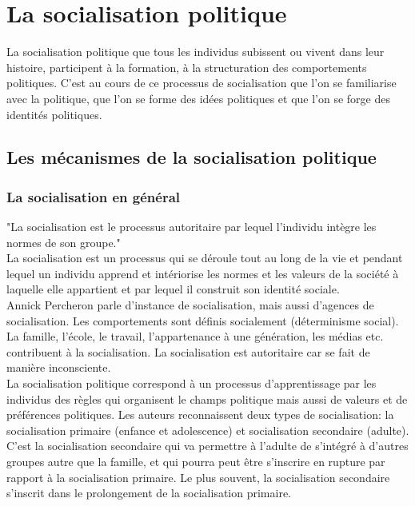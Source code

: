 \documentclass[12pt, a4paper, openany]{book}
\begin{document}
\section{La socialisation politique}

La socialisation politique que tous les individus subissent ou vivent dans leur histoire, participent à la formation, à la structuration des comportements politiques. C'est au cours de ce processus de socialisation que l'on se familiarise avec la politique, que l'on se forme des idées politiques et que l'on se forge des identités politiques. 

\subsection{Les mécanismes de la socialisation politique}

\subsubsection{La socialisation en général}

"La socialisation est le processus autoritaire par lequel l'individu intègre les normes de son groupe." \\
La socialisation est un processus qui se déroule tout au long de la vie et pendant lequel un individu apprend et intériorise les normes et les valeurs de la société à laquelle elle appartient et par lequel il construit son identité sociale. \\
Annick Percheron parle d'instance de socialisation, mais aussi d'agences de socialisation. Les comportements sont définis socialement (déterminisme social). \\
La famille, l'école, le travail, l'appartenance à une génération, les médias etc. contribuent à la socialisation. La socialisation est autoritaire car se fait de manière inconsciente. \\
La socialisation politique correspond à un processus d'apprentissage par les individus des règles qui organisent le champs politique mais aussi de valeurs et de préférences politiques. Les auteurs reconnaissent deux types de socialisation: la socialisation primaire (enfance et adolescence) et socialisation secondaire (adulte). \\
C'est la socialisation secondaire qui va permettre à l'adulte de s'intégré à d'autres groupes autre que la famille, et qui pourra peut être s'inscrire en rupture par rapport à la socialisation primaire. Le plus souvent, la socialisation secondaire s'inscrit dans le prolongement de la socialisation primaire.
\end{document}
